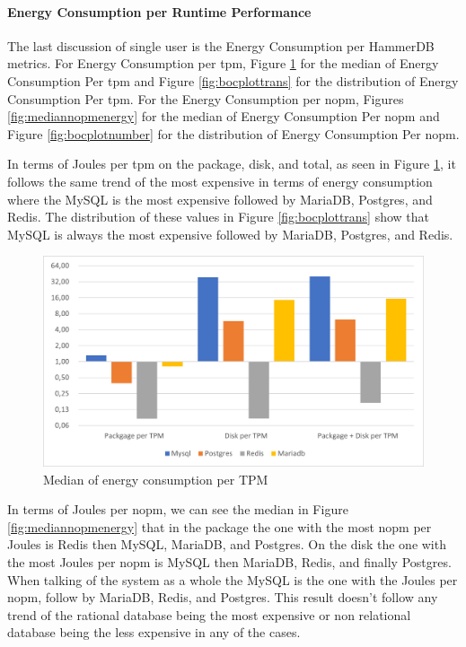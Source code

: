 



\paragraph{Energy Consumption per Runtime Performance} 

The last discussion of single user is the Energy Consumption per HammerDB metrics. For Energy Consumption per \gls{tpm}, Figure \ref{fig:mediantpmenergy} for the median of Energy Consumption Per \gls{tpm} and Figure \ref{fig:bocplottrans} for the distribution of Energy Consumption Per \gls{tpm}. For the Energy Consumption per \gls{nopm}, Figures \ref{fig:mediannopmenergy} for the median of Energy Consumption Per \gls{nopm} and Figure \ref{fig:bocplotnumber} for the distribution of Energy Consumption Per \gls{nopm}.




In terms of Joules per \gls{tpm} on the package, disk, and total, as seen in Figure \ref{fig:mediantpmenergy}, it follows the same trend of the most expensive in terms of energy consumption where the MySQL is the most expensive followed by MariaDB, Postgres, and Redis. The distribution of these values in Figure \ref{fig:bocplottrans} show that MySQL is always the most expensive followed by MariaDB, Postgres, and Redis.

\begin{figure}[H]
\centering
    \includegraphics[width=0.8\columnwidth]{results/median/energy-tpm.png}
\caption{Median of energy consumption per TPM}
\label{fig:mediantpmenergy}
\end{figure}







    In terms of Joules per \gls{nopm}, we can see the median in Figure \ref{fig:mediannopmenergy} that in the package the one with the most \gls{nopm} per Joules is Redis then MySQL, MariaDB, and Postgres. On the disk the one with the most Joules per \gls{nopm} is MySQL then MariaDB, Redis, and finally Postgres. When talking of the system as a whole the MySQL is the one with the Joules per \gls{nopm}, follow by MariaDB, Redis, and Postgres. This result doesn't follow any trend of the rational database being the most expensive or non relational database being the less expensive in any of the cases.

